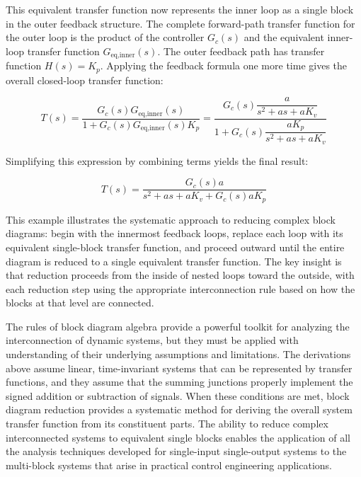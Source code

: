 This equivalent transfer function now represents the inner loop as a single block in the outer feedback structure. The complete forward-path transfer function for the outer loop is the product of the controller $G_c(s)$ and the equivalent inner-loop transfer function $G_{\text{eq,inner}}(s)$. The outer feedback path has transfer function $H(s) = K_p$. Applying the feedback formula one more time gives the overall closed-loop transfer function:

\begin{equation}
T(s) = \frac{G_c(s) G_{\text{eq,inner}}(s)}{1 + G_c(s) G_{\text{eq,inner}}(s) K_p} = \frac{G_c(s) \dfrac{a}{s^2 + a s + a K_v}}{1 + G_c(s) \dfrac{a K_p}{s^2 + a s + a K_v}}
\end{equation}

Simplifying this expression by combining terms yields the final result:

\begin{equation}
T(s) = \frac{G_c(s) a}{s^2 + a s + a K_v + G_c(s) a K_p}
\end{equation}

This example illustrates the systematic approach to reducing complex block diagrams: begin with the innermost feedback loops, replace each loop with its equivalent single-block transfer function, and proceed outward until the entire diagram is reduced to a single equivalent transfer function. The key insight is that reduction proceeds from the inside of nested loops toward the outside, with each reduction step using the appropriate interconnection rule based on how the blocks at that level are connected.

The rules of block diagram algebra provide a powerful toolkit for analyzing the interconnection of dynamic systems, but they must be applied with understanding of their underlying assumptions and limitations. The derivations above assume linear, time-invariant systems that can be represented by transfer functions, and they assume that the summing junctions properly implement the signed addition or subtraction of signals. When these conditions are met, block diagram reduction provides a systematic method for deriving the overall system transfer function from its constituent parts. The ability to reduce complex interconnected systems to equivalent single blocks enables the application of all the analysis techniques developed for single-input single-output systems to the multi-block systems that arise in practical control engineering applications.


